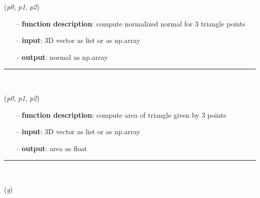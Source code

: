 \begin{itemize}[leftmargin=1.4cm]
\begin{itemize}[leftmargin=1.4cm]
\begin{itemize}[leftmargin=0.5cm]
\begin{itemize}[leftmargin=1.4cm]
\begin{itemize}[leftmargin=1.4cm]
\begin{itemize}[leftmargin=0.5cm]
\begin{itemize}[leftmargin=1.4cm]
\begin{itemize}[leftmargin=0.5cm]
\begin{flushleft}
\label{sec:graphicsDataUtilities:ComputeTriangleNormal}
({\it p0}, {\it p1}, {\it p2})
\end{flushleft}
\setlength{\itemindent}{0.7cm}
\begin{itemize}[leftmargin=0.7cm]
  \item[--]  {\bf function description}: compute normalized normal for 3 triangle points  \item[--]  {\bf input}: 3D vector as list or as np.array  \item[--]  {\bf output}: normal as np.array\vspace{12pt}\end{itemize}
%
\noindent\rule{8cm}{0.75pt}\vspace{1pt} \\ 
\begin{flushleft}
\label{sec:graphicsDataUtilities:ComputeTriangleArea}
({\it p0}, {\it p1}, {\it p2})
\end{flushleft}
\setlength{\itemindent}{0.7cm}
\begin{itemize}[leftmargin=0.7cm]
  \item[--]  {\bf function description}: compute area of triangle given by 3 points  \item[--]  {\bf input}: 3D vector as list or as np.array  \item[--]  {\bf output}: area as float\vspace{12pt}\end{itemize}
%
\noindent\rule{8cm}{0.75pt}\vspace{1pt} \\ 
\begin{flushleft}
\label{sec:graphicsDataUtilities:GraphicsData2PointsAndTrigs}
({\it g})
\end{flushleft}
\setlength{\itemindent}{0.7cm}
\begin{itemize}[leftmargin=0.7cm]

\end{itemize}
\end{itemize}
\end{itemize}
\end{itemize}
\end{itemize}
\end{itemize}
\end{itemize}
\end{itemize}
\end{itemize}
